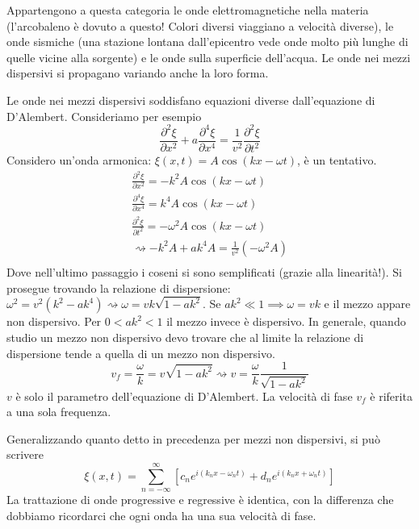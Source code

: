 Appartengono a questa categoria le onde elettromagnetiche nella materia (l'arcobaleno è dovuto a questo! Colori diversi viaggiano a velocità diverse), le onde sismiche (una stazione lontana dall'epicentro vede onde molto più lunghe di quelle vicine alla sorgente) e le onde sulla superficie dell'acqua. Le onde nei mezzi dispersivi si propagano variando anche la loro forma.

\begin{eg}
	Le onde nei mezzi dispersivi soddisfano equazioni diverse dall'equazione di D'Alembert. Consideriamo per esempio
	\[
		\frac{\partial ^{2} \xi }{\partial x^{2} } + a \frac{\partial ^4 \xi }{\partial x^4}  = \frac{1}{v^{2} }\frac{\partial ^{2} \xi }{\partial t^{2} } 
	\]
	Considero un'onda armonica: \(\xi (x,t) = A \cos (kx - \omega t)\), è un tentativo.
	\begin{gather*}
		\frac{\partial ^{2} \xi }{\partial x^{2} } = - k^{2} A \cos (kx - \omega t)\\
		\frac{\partial ^4 \xi }{\partial x^4} = k^{4} A \cos (kx - \omega t)\\
		\frac{\partial ^{2} \xi }{\partial t^{2} } = - \omega ^2 A \cos (kx - \omega t)\\
		\rightsquigarrow - k^{2} A + a k^{4} A = \frac{1}{v^{2} }(- \omega ^2 A)\\ 
	\end{gather*}
	Dove nell'ultimo passaggio i coseni si sono semplificati (grazie alla linearità!). Si prosegue trovando la relazione di dispersione: \(\omega ^{2} = v ^{2} (k^{2} -ak^4) \rightsquigarrow \omega = vk\sqrt{1-ak^2} \). Se \(ak^{2} \ll 1 \implies \omega = vk\) e il mezzo appare non dispersivo. Per \(0<ak^{2} <1\) il mezzo invece è dispersivo. In generale, quando studio un mezzo non dispersivo devo trovare che al limite la relazione di dispersione tende a quella di un mezzo non dispersivo.
	\[
		v_f = \frac{\omega }{k} = v\sqrt{1-ak^{2} } \rightsquigarrow v= \frac{\omega }{k}\frac{1}{\sqrt{1-ak^{2} } } 
	\]
	\(v\) è solo il parametro dell'equazione di D'Alembert. La velocità di fase \(v_f\) è riferita a una sola frequenza.
\end{eg}

Generalizzando quanto detto in precedenza per mezzi non dispersivi, si può scrivere
\[
	\xi (x,t) = \sum_{n=-\infty }^{\infty} [c_n e^{i(k_n x - \omega _n t)} + d_n e^{i(k_n x + \omega _n t)}]
\]
La trattazione di onde progressive e regressive è identica, con la differenza che dobbiamo ricordarci che ogni onda ha una sua velocità di fase.